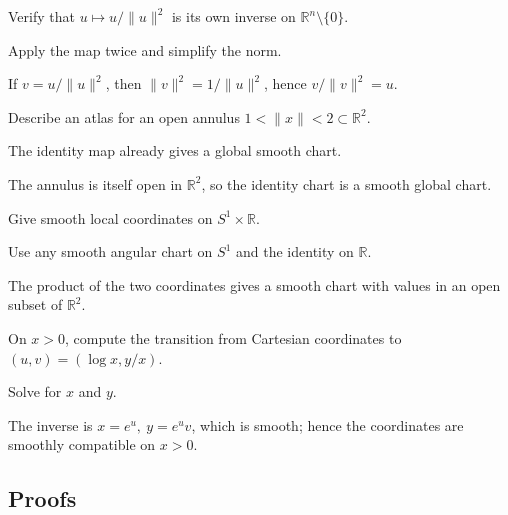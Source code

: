 \begin{exercise}\label{exr:vii02-ped-02}
Verify that \(u\mapsto u/\lVert u\rVert^2\) is its own inverse on \(\mathbb R^n\setminus\{0\}\).
\end{exercise}
\begin{hint}
Apply the map twice and simplify the norm.
\end{hint}
\begin{solution}
If \(v=u/\|u\|^2\), then \(\|v\|^2=1/\|u\|^2\), hence \(v/\|v\|^2=u\).
\end{solution}

\begin{exercise}\label{exr:vii02-ped-03}
Describe an atlas for an open annulus \(1<\|x\|<2\subset\mathbb R^2\).
\end{exercise}
\begin{hint}
The identity map already gives a global smooth chart.
\end{hint}
\begin{solution}
The annulus is itself open in \(\mathbb R^2\), so the identity chart is a smooth global chart.
\end{solution}

\begin{exercise}\label{exr:vii02-ped-04}
Give smooth local coordinates on \(S^1\times\mathbb R\).
\end{exercise}
\begin{hint}
Use any smooth angular chart on \(S^1\) and the identity on \(\mathbb R\).
\end{hint}
\begin{solution}
The product of the two coordinates gives a smooth chart with values in an open subset of \(\mathbb R^2\).
\end{solution}

\begin{exercise}\label{exr:vii02-ped-05}
On \(x>0\), compute the transition from Cartesian coordinates to \((u,v)=(\log x,y/x)\).
\end{exercise}
\begin{hint}
Solve for \(x\) and \(y\).
\end{hint}
\begin{solution}
The inverse is \(x=e^u,\ y=e^u v\), which is smooth; hence the coordinates are smoothly compatible on \(x>0\).
\end{solution}

\subsection*{Proofs}

